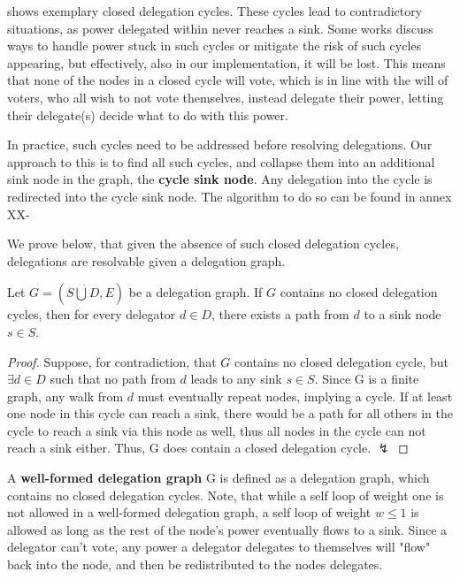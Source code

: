 shows exemplary closed delegation cycles. These cycles lead to contradictory situations, as power delegated within never reaches a sink. Some works discuss ways to handle power stuck in such cycles or mitigate the risk of such cycles appearing, but effectively, also in our implementation, it will be lost. \cite{behrensCircularDelegationsMyth2015, brillInteractiveDemocracy2018} This means that none of the nodes in a closed cycle will vote, which is in line with the will of voters, who all wish to not vote themselves, instead delegate their power, letting their delegate(s) decide what to do with this power. 

In practice, such cycles need to be addressed before resolving delegations. Our approach to this is to find all such cycles, and collapse them into an additional sink node in the graph, the \textbf{cycle sink node}. Any delegation into the cycle is redirected into the cycle sink node. The algorithm to do so can be found in annex XX-   

We prove below, that given the absence of such closed delegation cycles, delegations are resolvable given a delegation graph. 

\begin{theorem}
Let $G = (S \dot\bigcup D, E)$ be a delegation graph. If $G$ contains no closed delegation cycles, then for every delegator $d \in D$, there exists a path from $d$ to a sink node $s \in S$.
\end{theorem}
\begin{proof}
Suppose, for contradiction, that $G$ contains no closed delegation cycle, but $\exists d \in D$ such that no path from $d$ leads to any sink $s \in S$. Since G is a finite graph, any walk from $d$ must eventually repeat nodes, implying a cycle. If at least one node in this cycle can reach a sink, there would be a path for all others in the cycle to reach a sink via this node as well, thus all nodes in the cycle can not reach a sink either. Thus, G does contain a closed delegation cycle. $\lightning$
\end{proof}

 A \textbf{well-formed delegation graph} G is defined as a delegation graph, which contains no closed delegation cycles. Note, that while a self loop of weight one is not allowed in a well-formed delegation graph, a self loop of weight $w \le 1$ is allowed as long as the rest of the node's power eventually flows to a sink. Since a delegator can't vote, any power a delegator delegates to themselves will "flow" back into the node, and then be redistributed to the nodes delegates. 
 
